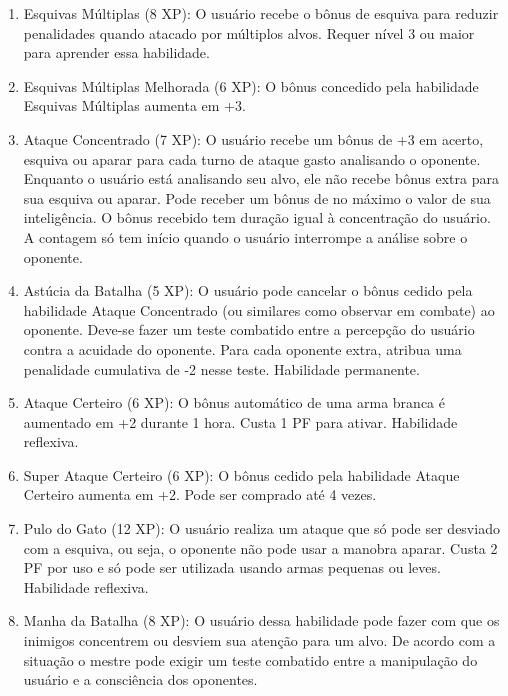 \begin{enumerate}
	\item Esquivas Múltiplas (8 XP): O usuário recebe o bônus de esquiva para reduzir penalidades quando atacado por múltiplos alvos. Requer nível 3 ou maior para aprender essa habilidade.	

	\item Esquivas Múltiplas Melhorada (6 XP): O bônus concedido pela habilidade Esquivas Múltiplas aumenta em +3. 
			
	\item Ataque Concentrado (7 XP): O usuário recebe um bônus de +3 em acerto, esquiva ou aparar para cada turno de ataque gasto analisando o oponente. Enquanto o usuário está analisando seu alvo, ele não recebe bônus extra para sua esquiva ou aparar. Pode receber um bônus de no máximo o valor de sua inteligência. O bônus recebido tem duração igual à concentração do usuário. A contagem só tem início quando o usuário interrompe a análise sobre o oponente.

	\item Astúcia da Batalha (5 XP): O usuário pode cancelar o bônus cedido pela habilidade Ataque Concentrado (ou similares como observar em combate) ao oponente. Deve-se fazer um teste combatido entre a percepção do usuário contra a acuidade do oponente. Para cada oponente extra, atribua uma penalidade cumulativa de -2 nesse teste. Habilidade permanente.
	
	\item Ataque Certeiro (6 XP): O bônus automático de uma arma branca é aumentado em +2 durante 1 hora. Custa 1 PF para ativar. Habilidade reflexiva.
	
	\item Super Ataque Certeiro (6 XP): O bônus cedido pela habilidade Ataque Certeiro aumenta em +2. Pode ser comprado até 4 vezes.
	
	\item Pulo do Gato (12 XP): O usuário realiza um ataque que só pode ser desviado com a esquiva, ou seja, o oponente não pode usar a manobra aparar. Custa 2 PF por uso e só pode ser utilizada usando armas pequenas ou leves. Habilidade reflexiva.
		
	\item Manha da Batalha (8 XP): O usuário dessa habilidade pode fazer com que os inimigos concentrem ou desviem sua atenção para um alvo. De acordo com a situação o mestre pode exigir um teste combatido entre a manipulação do usuário e a consciência dos oponentes.


\end{enumerate}
